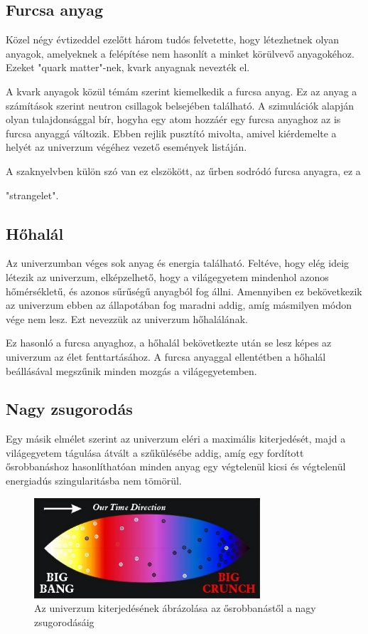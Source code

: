 \documentclass[a4paper]{article}
\begin{document}
\subsection*{Furcsa anyag}
Közel négy évtizeddel ezelőtt három tudós felvetette, hogy létezhetnek olyan anyagok, amelyeknek a felépítése nem hasonlít a minket körülvevő anyagokéhoz. Ezeket "quark matter"-nek, kvark anyagnak nevezték el. \cite{PhysRevD.30.2379}
\par
A kvark anyagok közül témám szerint kiemelkedik a furcsa anyag. Ez az anyag a számítások szerint neutron csillagok belsejében található.  A szimulációk alapján olyan tulajdonsággal bír, hogyha egy atom hozzáér egy furcsa anyaghoz az is furcsa anyaggá változik. \cite{strange_matter} Ebben rejlik pusztító mivolta, amivel kiérdemelte a helyét az univerzum végéhez vezető események listáján.
\par
{
\footnotesize
A szaknyelvben külön szó van ez elszökött, az űrben sodródó furcsa anyagra, ez a
\begin{otherlanguage}{english}
    "strangelet".
\end{otherlanguage}
}

\subsection*{Hőhalál}
Az univerzumban véges sok anyag és energia található. Feltéve, hogy elég ideig létezik az univerzum, elképzelhető, hogy a világegyetem mindenhol azonos hőmérsékletű, és azonos sűrűségű anyagból fog állni. Amennyiben ez bekövetkezik az univerzum ebben az állapotában fog maradni addig, amíg másmilyen módon vége nem lesz. Ezt nevezzük az univerzum hőhalálának.
\par
Ez hasonló a furcsa anyaghoz, a hőhalál bekövetkezte után se lesz képes az univerzum az élet fenttartásához. A furcsa anyaggal ellentétben a hőhalál beállásával megszűnik minden mozgás a világegyetemben.

\subsection*{Nagy zsugorodás}
Egy másik elmélet szerint az univerzum eléri a maximális kiterjedését, majd a világegyetem tágulása átvált a szűkülésébe addig, amíg egy fordított ősrobbanáshoz hasonlíthatóan minden anyag egy végtelenül kicsi és végtelenül energiadús szingularitásba nem tömörül.

\begin{figure}
    \centering
    \includegraphics[width=0.75\textwidth]{bigcrunch.jpg}
    \caption{Az univerzum kiterjedésének ábrázolása az ősrobbanástől a nagy zsugorodásáig}
    \label{fig:bigcrunch}
\end{figure}
\end{document}
